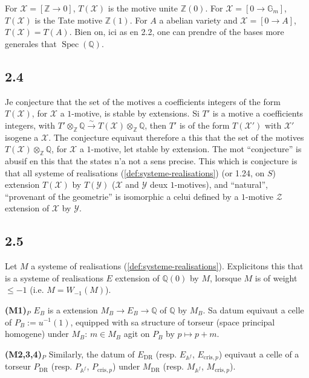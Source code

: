 \documentclass[12pt,a4paper]{article}
\theoremstyle{plain}
\theoremstyle{definition}
\theoremstyle{remark}
\DeclareMathOperator{\Spec}{Spec}
\providecommand{\Spec}{\operatorname{Spec}}
\providecommand{\DR}{\mathrm{DR}}
\providecommand{\cris}{\mathrm{cris}}
\begin{document}
For $\mathcal{X} = [\mathbb{Z} \to 0]$, $T(\mathcal{X})$ is the motive unite
$\mathbb{Z}(0)$. For $\mathcal{X} = [0 \to \mathbb{G}_m]$,
$T(\mathcal{X})$ is the Tate motive $\mathbb{Z}(1)$. For $A$ a abelian variety and $\mathcal{X} = [0 \to A]$, $T(\mathcal{X}) = T(A)$. Bien on, ici as
en 2.2, one can prendre of the bases more generales that $\Spec(\mathbb{Q})$.

\subsection*{2.4}

Je conjecture that the set of the motives a coefficients integers of the form
$T(\mathcal{X})$, for $\mathcal{X}$ a $1$-motive, is stable by extensions. Si $T'$ is
a motive a coefficients integers, with $T' \otimes_{\mathbb{Z}} \mathbb{Q} \xrightarrow{\sim}
T(\mathcal{X}) \otimes_{\mathbb{Z}} \mathbb{Q}$, then $T'$ is of the form $T(\mathcal{X}')$
with $\mathcal{X}'$ isogene a $\mathcal{X}$. The conjecture equivaut therefore a this that
the set of the motives $T(\mathcal{X}) \otimes_{\mathbb{Z}} \mathbb{Q}$, for $\mathcal{X}$ a
$1$-motive, let stable by extension. The mot ``conjecture'' is abusif en this that
the states n'a not a sens precise. This which is conjecture is that all systeme of
realisations (\ref{def:systeme-realisations}) (or 1.24, on $S$) extension
$T(\mathcal{X})$ by $T(\mathcal{Y})$ ($\mathcal{X}$ and $\mathcal{Y}$ deux $1$-motives), and
``natural'', ``provenant of the geometrie'' is isomorphic a celui defined by a
$1$-motive $\mathcal{Z}$ extension of $\mathcal{X}$ by $\mathcal{Y}$.

\subsection*{2.5}

Let $M$ a systeme of realisations (\ref{def:systeme-realisations}). Explicitons this
that is a systeme of realisations $E$ extension of $\mathbb{Q}(0)$ by $M$, lorsque $M$
is of weight $\leq -1$ (i.e. $M = W_{-1}(M)$).

\textbf{(M1)$_P$} $E_B$ is a extension $M_B \to E_B \to \mathbb{Q}$ of $\mathbb{Q}$ by
$M_B$. Sa datum equivaut a celle of $P_B := u^{-1}(1)$, equipped with sa structure of
torseur (space principal homogene) under $M_B$: $m \in M_B$ agit on $P_B$ by
$p \mapsto p + m$.

\textbf{(M2,3,4)$_P$} Similarly, the datum of $E_{\DR}$ (resp. $E_{\mathbb{A}^f}$,
$E_{\cris,p}$) equivaut a celle of a torseur $P_{\DR}$ (resp. $P_{\mathbb{A}^f}$,
$P_{\cris,p}$) under $M_{\DR}$ (resp. $M_{\mathbb{A}^f}$, $M_{\cris,p}$).
\end{document}
